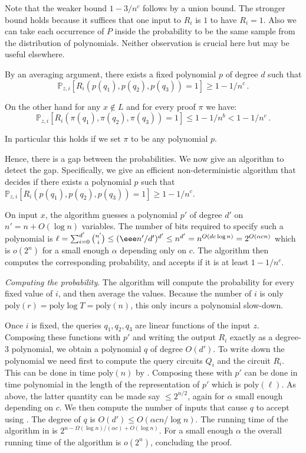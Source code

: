 \documentclass{toc}
\renewcommand{\P}{\mathbb{P}}
\newcommand{\poly}{\mathrm{poly}}
\begin{document}
Note that the weaker bound $1-3/n^{c}$ follows by a union bound.
The stronger bound holds because it suffices that one input to $R_{i}$
is $1$ to have $R_{i}=1$. Also we can take each occurrence of $P$
inside the probability to be the same sample from the distribution
of polynomials. Neither observation is crucial here but may be useful
elsewhere.

By an averaging argument, there exists a fixed polynomial $p$ of
degree $d$ such that
\[
\P_{z,i}[R_{i}(p(q_{1}),p(q_{2}),p(q_{3}))=1]\ge1-1/n^{c}\,.
\]

On the other hand for any $x\not\in L$ and for every proof $\pi$
we have:
\[
\P_{z,i}[R_{i}(\pi(q_{1}),\pi(q_{2}),\pi(q_{3}))=1]\le1-1/n^{b}<1-1/n^{c}\,.
\]

In particular this holds if we set $\pi$ to be any polynomial $p$.

Hence, there is a gap between the probabilities. We now give an algorithm
to detect the gap. Specifically, we give an efficient non-deterministic
algorithm that decides if there exists a polynomial $p$ such that
$\P_{z,i}[R_{i}(p(q_{1}),p(q_{2}),p(q_{3}))=1]\ge1-1/n^{c}.$

On input $x$, the algorithm guesses a polynomial $p'$ of degree
$d'$ on $n'=n+O(\log n)$ variables. The number of bits required
to specify such a polynomial is
$\ell=\sum_{i=0}^{d'}\binom{n'}{i}\le(\eee n'/d')^{d'}\le n^{d'}=n^{O(dc\log n)}=2^{O(\alpha cn)}$
which is $o(2^{n})$ for a small enough $\alpha$ depending only on
$c$. The algorithm then computes the corresponding probability, and
accepts if it is at least $1-1/n^{c}$.

\emph{Computing the probability}. The algorithm will compute the probability
for every fixed value of $i$, and then average the values. Because
the number of $i$ is only $\poly(r)=\poly\log T=\poly(n)$, this
only incurs a polynomial slow-down.

Once $i$ is fixed, the queries $q_{1},q_{2},q_{3}$ are linear functions
of the input $z$. Composing these functions with $p'$ and writing
the output $R_{i}$ exactly as a degree-3 polynomial, we obtain a
polynomial $q$ of degree $O(d')$. To write down the polynomial we
need first to compute the query circuits $Q_{i}$ and the circuit
$R_{i}$. This can be done in time $\poly(n)$ by .
Composing these with $p'$ can be done in time polynomial in the length
of the representation of $p'$ which is $\poly(\ell)$. As above,
the latter quantity can be made say $\le2^{n/2}$, again for $\alpha$
small enough depending on $c$. We then compute the number of inputs
that cause $q$ to accept using .
The degree of $q$ is $O(d')\le O(\alpha cn/\log n)$. The running
time of the algorithm in  is $2^{n-\Omega(\log n)/(\alpha c)+O(\log n)}$.
For a small enough $\alpha$ the overall running time of the algorithm
is $o(2^{n})$, concluding the proof.
\end{document}
